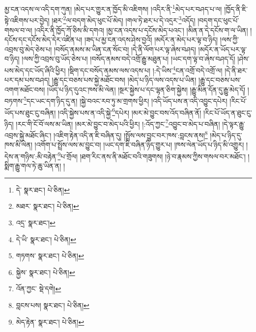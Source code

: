 མྱ་ངན་འདས་ལ་འདི་དག་ཀུན། །མེད་པར་གྱུར་ན་ཁྱོད་མི་འཇིགས། །འདིར་ནི་\footnote{དེ་  སྣར་ཐང་།  པེ་ཅིན། }མེད་པར་བཤད་པ་ལ། །ཁྱོད་ནི་ཇི་སྟེ་འཇིགས་པར་བྱེད། །ཐར་\footnote{མཐར་  སྣར་ཐང་།  པེ་ཅིན། }ལ་བདག་མེད་ཕུང་པོ་མེད། །གལ་ཏེ་ཐར་པ་དེ་འདྲར་\footnote{འདྲ་  སྣར་ཐང་། }འདོད། །བདག་དང་ཕུང་པོ་གསལ་བ་ལ། །འདིར་ནི་ཁྱོད་ཀོ་ཅིས་མི་དགའ། །མྱ་ངན་འདས་པ་དངོས་མེད་པའང་། །མིན་ན་དེ་དངོས་ག་ལ་ཡིན། །དངོས་དང་དངོས་མེད་དེར་འཛིན་པ། །ཟད་པ་མྱ་ངན་འདས་ཤེས་བྱའོ། །མདོར་ན་མེད་པར་ལྟ་བ་ཉིད། །ལས་ཀྱི་འབྲས་བུ་མེད་ཅེས་པ། །བསོད་ནམས་མ་ཡིན་ངན་སོང་བ། །དེ་ནི་ལོག་པར་ལྟ་ཞེས་བཤད། །མདོར་ན་ཡོད་པར་ལྟ་བ་ཉིད། །ལས་ཀྱི་འབྲས་བུ་ཡོད་ཅེས་པ། །བསོད་ནམས་བདེ་འགྲོ་རྒྱུ་མཐུན་པ། །ཡང་དག་ལྟ་བ་ཞེས་བཤད་དོ། །ཤེས་པས་མེད་དང་ཡོད་ཞིའི་ཕྱིར། །སྡིག་དང་བསོད་ནམས་ལས་འདས་པ། །:དེ་ཡིས་\footnote{དེ་ཡི་  སྣར་ཐང་།  པེ་ཅིན། }ངན་འགྲོ་བདེ་འགྲོ་ལ། །དེ་ནི་ཐར་པར་དམ་པས་བཤད། །རྒྱུ་དང་བཅས་པས་སྐྱེ་མཐོང་བས། །མེད་པ་ཉིད་ལས་འདས་པ་ཡིན། །རྒྱུ་དང་བཅས་པས་འགག་མཐོང་བས། །ཡོད་པ་ཉིད་དུའང་ཁས་མི་ལེན། །སྔར་སྐྱེས་པ་དང་ལྷན་ཅིག་སྐྱེས། །རྒྱུ་མིན་དོན་དུ་རྒྱུ་མེད་དོ། །བཏགས་\footnote{གཏགས་  སྣར་ཐང་།  པེ་ཅིན། }དང་ཡང་དག་ཉིད་དུ་ན། །སྐྱེ་བའང་རབ་ཏུ་མ་གྲགས་ཕྱིར། །འདི་ཡོད་པས་ན་འདི་འབྱུང་དཔེར། །རིང་པོ་ཡོད་པས་ཐུང་ངུ་བཞིན། །འདི་སྐྱེས་པས་ན་འདི་སྐྱེ་\footnote{སྐྱེས་  སྣར་ཐང་།  པེ་ཅིན། }དཔེར། །མར་མེ་བྱུང་བས་འོད་བཞིན་ནོ། །རིང་པོ་ཡོད་ན་ཐུང་ངུ་ཉིད། །རང་གི་ངོ་བོ་ལས་མ་ཡིན། །མར་མེ་བྱུང་བ་མེད་པའི་ཕྱིར། །:འོད་ཀྱང་\footnote{འོན་ཀྱང་  སྡེ་དགེ། }འབྱུང་བ་མེད་པ་བཞིན། །དེ་ལྟར་རྒྱུ་འབྲས་སྐྱེ་མཐོང་ཞིང་། །འཇིག་རྟེན་འདི་ན་ཇི་བཞིན་དུ། །སྤྲོས་ལས་བྱུང་བར་ཁས་:བླངས་ནས།\footnote{བླངས་པས།  སྣར་ཐང་།  པེ་ཅིན། } །མེད་པ་ཉིད་དུ་ཁས་མི་ལེན། །འགོག་པ་སྤྲོས་ལས་མ་བྱུང་བ། །ཡང་དག་ཇི་བཞིན་ཉིད་གྱུར་པ། །ཁས་ལེན་ཡོད་པ་ཉིད་མི་འགྱུར། །དེས་ན་གཉིས་:མི་བརྟེན་\footnote{མེད་རྟེན་  སྣར་ཐང་།  པེ་ཅིན། }པ་གྲོལ། །ཐག་རིང་ནས་ནི་མཐོང་བའི་གཟུགས། །ཉེ་བ་རྣམས་ཀྱིས་གསལ་བར་མཐོང་། །སྨིག་རྒྱུ་གལ་ཏེ་ཆུ་ཡིན་ན། །
